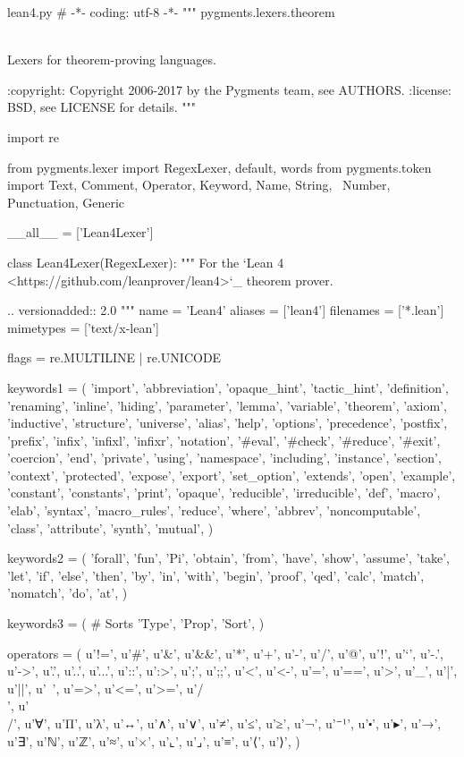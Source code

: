 \begin{filecontents}[noheader]{lean4.py}
# -*- coding: utf-8 -*-
"""
    pygments.lexers.theorem
    ~~~~~~~~~~~~~~~~~~~~~~~

    Lexers for theorem-proving languages.

    :copyright: Copyright 2006-2017 by the Pygments team, see AUTHORS.
    :license: BSD, see LICENSE for details.
"""

import re

from pygments.lexer import RegexLexer, default, words
from pygments.token import Text, Comment, Operator, Keyword, Name, String, \
    Number, Punctuation, Generic

__all__ = ['Lean4Lexer']

class Lean4Lexer(RegexLexer):
    """
    For the `Lean 4 <https://github.com/leanprover/lean4>`_
    theorem prover.

    .. versionadded:: 2.0
    """
    name = 'Lean4'
    aliases = ['lean4']
    filenames = ['*.lean']
    mimetypes = ['text/x-lean']

    flags = re.MULTILINE | re.UNICODE

    keywords1 = (
        'import', 'abbreviation', 'opaque_hint', 'tactic_hint', 'definition',
        'renaming', 'inline', 'hiding', 'parameter', 'lemma', 'variable',
        'theorem', 'axiom', 'inductive', 'structure', 'universe', 'alias',
        'help', 'options', 'precedence', 'postfix', 'prefix',
        'infix', 'infixl', 'infixr', 'notation', '#eval',
        '#check', '#reduce', '#exit', 'coercion', 'end', 'private', 'using', 'namespace',
        'including', 'instance', 'section', 'context', 'protected', 'expose',
        'export', 'set_option', 'extends', 'open', 'example',
        'constant', 'constants', 'print', 'opaque', 'reducible', 'irreducible',
        'def', 'macro', 'elab', 'syntax', 'macro_rules', 'reduce', 'where',
        'abbrev', 'noncomputable', 'class', 'attribute', 'synth', 'mutual',
    )

    keywords2 = (
        'forall', 'fun', 'Pi', 'obtain', 'from', 'have', 'show', 'assume',
        'take', 'let', 'if', 'else', 'then', 'by', 'in', 'with', 'begin',
        'proof', 'qed', 'calc', 'match', 'nomatch', 'do', 'at',
    )

    keywords3 = (
        # Sorts
        'Type', 'Prop', 'Sort',
    )

    operators = (
        u'!=', u'#', u'&', u'&&', u'*', u'+', u'-', u'/', u'@', u'!', u'`',
        u'-.', u'->', u'.', u'..', u'...', u'::', u':>', u';', u';;', u'<',
        u'<-', u'=', u'==', u'>', u'_', u'|', u'||', u'~', u'=>', u'<=', u'>=',
        u'/\\', u'\\/', u'∀', u'Π', u'λ', u'↔', u'∧', u'∨', u'≠', u'≤', u'≥',
        u'¬', u'⁻¹', u'⬝', u'▸', u'→', u'∃', u'ℕ', u'ℤ', u'≈', u'×', u'⌞',
        u'⌟', u'≡', u'⟨', u'⟩',
    )


\end{filecontents}
